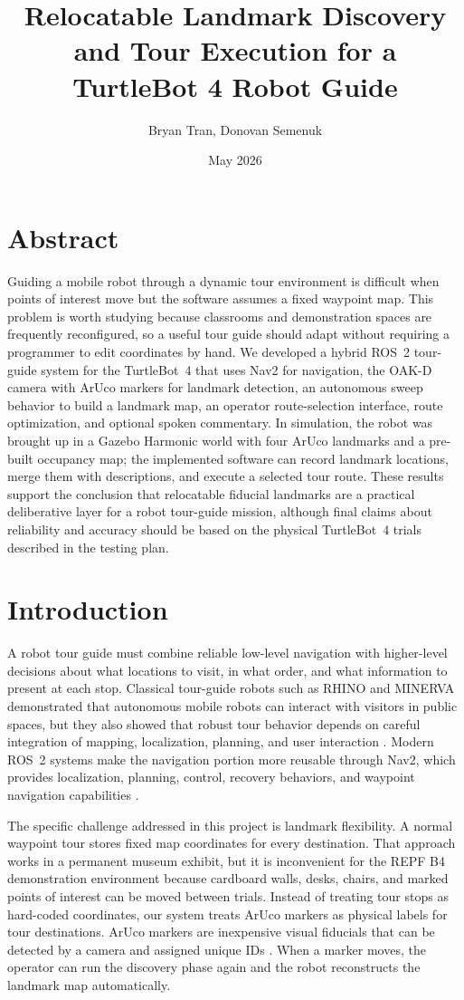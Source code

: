 \documentclass[12pt]{article}
\title{\textbf{Relocatable Landmark Discovery and Tour Execution for a TurtleBot 4 Robot Guide}}
\author{Bryan Tran, Donovan Semenuk}
\date{May 2026}
\begin{document}
\maketitle

\section*{Abstract}
Guiding a mobile robot through a dynamic tour environment is difficult when points of interest move but the software assumes a fixed waypoint map. This problem is worth studying because classrooms and demonstration spaces are frequently reconfigured, so a useful tour guide should adapt without requiring a programmer to edit coordinates by hand. We developed a hybrid ROS~2 tour-guide system for the TurtleBot~4 that uses Nav2 for navigation, the OAK-D camera with ArUco markers for landmark detection, an autonomous sweep behavior to build a landmark map, an operator route-selection interface, route optimization, and optional spoken commentary. In simulation, the robot was brought up in a Gazebo Harmonic world with four ArUco landmarks and a pre-built occupancy map; the implemented software can record landmark locations, merge them with descriptions, and execute a selected tour route. These results support the conclusion that relocatable fiducial landmarks are a practical deliberative layer for a robot tour-guide mission, although final claims about reliability and accuracy should be based on the physical TurtleBot~4 trials described in the testing plan.

\section*{Introduction}
A robot tour guide must combine reliable low-level navigation with higher-level decisions about what locations to visit, in what order, and what information to present at each stop. Classical tour-guide robots such as RHINO and MINERVA demonstrated that autonomous mobile robots can interact with visitors in public spaces, but they also showed that robust tour behavior depends on careful integration of mapping, localization, planning, and user interaction \cite{burgard1999rhino,thrun1999minerva}. Modern ROS~2 systems make the navigation portion more reusable through Nav2, which provides localization, planning, control, recovery behaviors, and waypoint navigation capabilities \cite{macenski2020marathon2}.

The specific challenge addressed in this project is landmark flexibility. A normal waypoint tour stores fixed map coordinates for every destination. That approach works in a permanent museum exhibit, but it is inconvenient for the REPF B4 demonstration environment because cardboard walls, desks, chairs, and marked points of interest can be moved between trials. Instead of treating tour stops as hard-coded coordinates, our system treats ArUco markers as physical labels for tour destinations. ArUco markers are inexpensive visual fiducials that can be detected by a camera and assigned unique IDs \cite{opencv_aruco}. When a marker moves, the operator can run the discovery phase again and the robot reconstructs the landmark map automatically.
\end{document}
